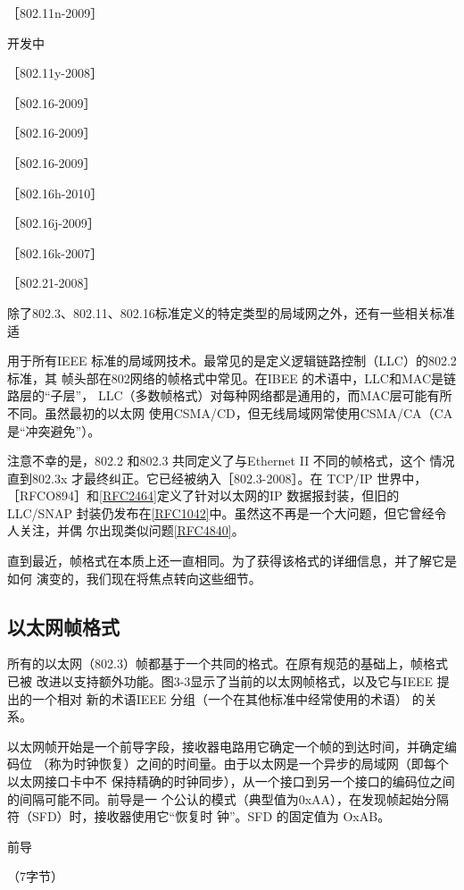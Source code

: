 ［802.11n-2009］

开发中

［802.11y-2008］

［802.16-2009］

［802.16-2009］

［802.16-2009］

［802.16h-2010］

［802.16j-2009］

［802.16k-2007］

［802.21-2008］

除了802.3、802.11、802.16标准定义的特定类型的局域网之外，还有一些相关标准适

用于所有IEEE 标准的局域网技术。最常见的是定义逻辑链路控制（LLC）的802.2标准，其
帧头部在802网络的帧格式中常见。在IBEE 的术语中，LLC和MAC是链路层的“子层”，
LLC（多数帧格式）对每种网络都是通用的，而MAC层可能有所不同。虽然最初的以太网
使用CSMA/CD，但无线局域网常使用CSMA/CA（CA 是“冲突避免”）。

注意不幸的是，802.2 和802.3 共同定义了与Ethernet II 不同的帧格式，这个
情况直到802.3x 才最终纠正。它已经被纳入［802.3-2008］。在 TCP/IP 世界中，
［RFCO894］和\href{https://www.rfc-editor.org/rfc/rfc2464}{[RFC2464]}定义了针对以太网的IP 数据报封装，但旧的LLC/SNAP
封装仍发布在\href{https://www.rfc-editor.org/rfc/rfc1042}{[RFC1042]}中。虽然这不再是一个大问题，但它曾经令人关注，并偶
尔出现类似问题\href{https://www.rfc-editor.org/rfc/rfc4840}{[RFC4840]}。

直到最近，帧格式在本质上还一直相同。为了获得该格式的详细信息，并了解它是如何
演变的，我们现在将焦点转向这些细节。

\subsection{以太网帧格式}

所有的以太网（802.3）帧都基于一个共同的格式。在原有规范的基础上，帧格式已被
改进以支持额外功能。图3-3显示了当前的以太网帧格式，以及它与IEEE 提出的一个相对
新的术语IEEE 分组（一个在其他标准中经常使用的术语） 的关系。

以太网帧开始是一个前导字段，接收器电路用它确定一个帧的到达时间，并确定编码位
（称为时钟恢复）之间的时间量。由于以太网是一个异步的局域网（即每个以太网接口卡中不
保持精确的时钟同步），从一个接口到另一个接口的编码位之间的间隔可能不同。前导是一
个公认的模式（典型值为0xAA），在发现帧起始分隔符（SFD）时，接收器使用它“恢复时
钟”。SFD 的固定值为 OxAB。

前导

（7字节）

